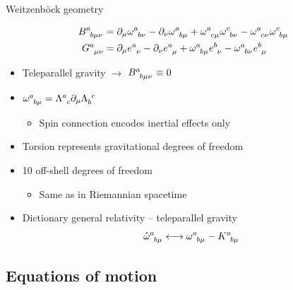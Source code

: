 \documentclass[t,hyperref={bookmarks=false}]{beamer}
\newcommand{\ind}{\indices}
\newcommand{\pd}{\partial}
\newcommand{\bitem}{\begin{itemize}}
\newcommand{\eitem}{\end{itemize}}
\begin{document}
\begin{frame}{Weitzenb\"ock geometry}

\begin{block}{}
\vspace{-\baselineskip}
\begin{align*}
  B\ind{^a_{b\mu\nu}} &= \pd_\mu \omega\ind{^a_{b\nu}} - \pd_\nu 
  \omega\ind{^a_{b\mu}} + \omega\ind{^a_{c\mu}} 
  \omega\ind{^c_{b\nu}} - \omega\ind{^a_{c\nu}} 
  \omega\ind{^c_{b\mu}}\\
  G\ind{^a_{\mu\nu}} &= \pd_\mu e\ind{^a_\nu} - \pd_\nu 
  e\ind{^a_\mu} + \omega\ind{^a_{b\mu}} e\ind{^b_\nu} 
  - \omega\ind{^a_{b\nu}} e\ind{^b_\mu}
\end{align*}
\end{block}

\bitem
\item Teleparallel gravity $\longrightarrow$ $B\ind{^a_{b\mu\nu}} 
  \equiv 0$
\item $\omega\ind{^a_{b\mu}} = \Lambda\ind{^a_c} \pd_\mu 
  \Lambda\ind{_b^c}$
  \bitem
  \item Spin connection encodes inertial effects only
  \eitem
\item<2-> Torsion represents gravitational degrees of freedom
\item<2-> 10 off-shell degrees of freedom
  \bitem
  \item Same as in Riemannian spacetime
  \eitem
\item<3-> Dictionary general relativity -- teleparallel gravity
  \begin{equation*}
    \mathring{\omega}\ind{^a_{b\mu}} \longleftrightarrow 
    \omega\ind{^a_{b\mu}} - K\ind{^a_{b\mu}}
    \end{equation*}
\eitem
\end{frame}

\subsection{Equations of motion}
\end{document}
